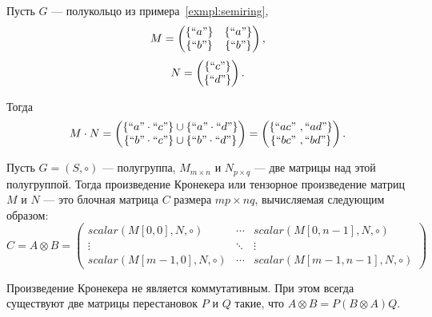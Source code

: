 \begin{example}
Пусть $G$ --- полукольцо из примера~\ref{exmpl:semiring},
$$ M =
\begin{pmatrix}
\{``a"\} & \{``a"\}\\
\{``b"\} & \{``b"\}\\
\end{pmatrix},
$$
$$ N =
\begin{pmatrix}
\{``c"\} \\
\{``d"\} \\
\end{pmatrix}.
$$

Тогда
$$
M \cdot N =
\begin{pmatrix}
\{``a" \cdot ``c"\} \cup \{``a" \cdot ``d"\} \\
\{``b" \cdot ``c"\} \cup \{``b" \cdot ``d"\}
\end{pmatrix}=
\begin{pmatrix}
\{``ac" \ ,  ``ad"\} \\
\{``bc" \ , ``bd"\}
\end{pmatrix}.
$$

\end{example}


\begin{definition}
Пусть $G = (S,\circ)$ --- полугруппа, $M_{m\times n}$ и $N_{p\times q}$ --- две матрицы над этой полугруппой.
Тогда произведение Кронекера или тензорное произведение матриц $M$ и $N$ --- это блочная матрица $C$ размера $mp \times nq$, вычисляемая следующим образом:
$$
C = A \otimes B =
\begin{pmatrix}
scalar(M[0,0],N,\circ)   & \cdots & scalar(M[0,n-1],N,\circ)   \\
\vdots                   & \ddots & \vdots       \\
scalar(M[m-1,0],N,\circ) & \cdots & scalar(M[m-1,n-1],N,\circ)
\end{pmatrix}
$$

\end{definition}

\begin{note}\label{note:KronIsNotCommutative}
Произведение Кронекера не является коммутативным.
При этом всегда существуют две матрицы перестановок $P$ и $Q$ такие, что $A \otimes B = P(B \otimes A)Q$.
\end{note}

\newcommand{\examplemtrx}
{
\begin{pmatrix}
5 & 6 & 7 & 8 \\
9 & 10 & 11 & 12 \\
13 & 14 & 15 & 16
\end{pmatrix}
}

